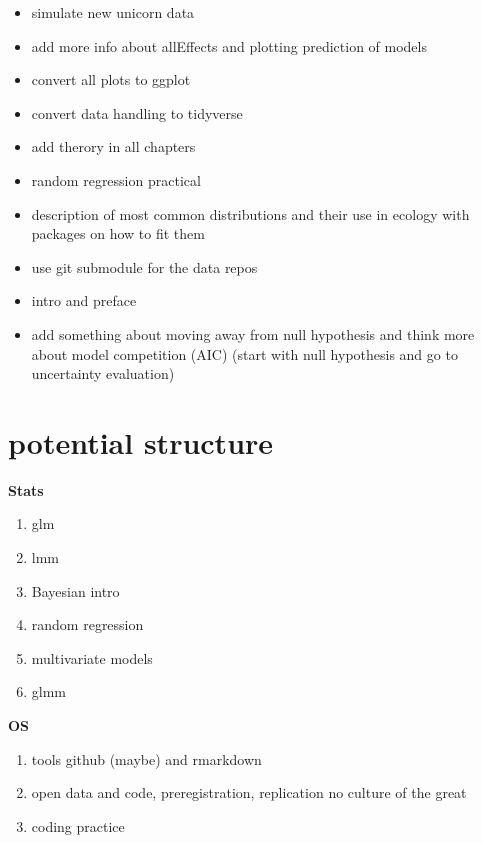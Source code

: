 \documentclass[
  12pt,
]{book}
\providecommand{\tightlist}{%
  \setlength{\itemsep}{0pt}\setlength{\parskip}{0pt}}
\begin{document}
\begin{itemize}
\tightlist
\item
  simulate new unicorn data
\item
  add more info about allEffects and plotting prediction of models
\item
  convert all plots to ggplot
\item
  convert data handling to tidyverse
\item
  add therory in all chapters
\item
  random regression practical
\item
  description of most common distributions and their use in ecology with packages on how to fit them
\item
  use git submodule for the data repos
\item
  intro and preface
\item
  add something about moving away from null hypothesis and think more about model competition (AIC) (start with null hypothesis and go to uncertainty evaluation)
\end{itemize}

\hypertarget{potential-structure}{%
\section{potential structure}\label{potential-structure}}

\textbf{Stats}

\begin{enumerate}
\def\labelenumi{\arabic{enumi}.}
\tightlist
\item
  glm
\item
  lmm
\item
  Bayesian intro
\item
  random regression
\item
  multivariate models
\item
  glmm
\end{enumerate}

\textbf{OS}

\begin{enumerate}
\def\labelenumi{\arabic{enumi}.}
\tightlist
\item
  tools github (maybe) and rmarkdown
\item
  open data and code, preregistration, replication no culture of the great
\item
  coding practice
\end{enumerate}

\backmatter

  

\printindex
\end{document}
